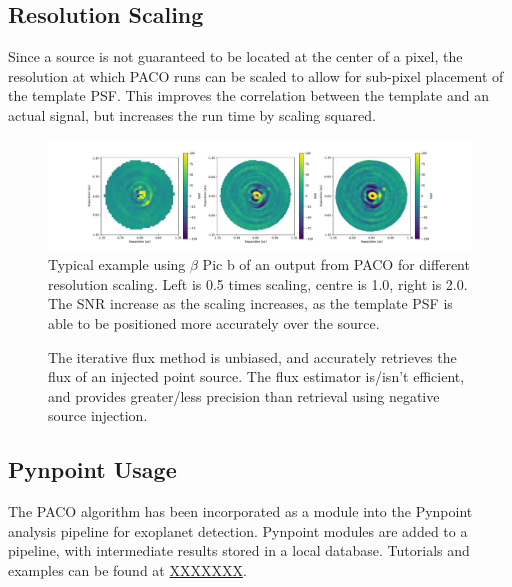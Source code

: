 \documentclass[twocolumn,fleqn]{aastex62}
\begin{document}
\subsection{Resolution Scaling}
Since a source is not guaranteed to be located at the center of a pixel, the resolution at which PACO runs can be scaled to allow for sub-pixel placement of the template PSF. This improves the correlation between the template and an actual signal, but increases the run time by scaling squared.
\begin{figure}[h]
	\hspace{-3em}
	\includegraphics[width=1.25\linewidth]{scaling_3}
	\caption{\label{fig:SNROut} Typical example using $\beta$ Pic b of an output from PACO for different resolution scaling. Left is 0.5 times scaling, centre is 1.0, right is 2.0. The SNR increase as the scaling increases, as the template PSF is able to be positioned more accurately over the source.}
\end{figure}

\begin{figure}[h]
	\caption{\label{fig:FluxRetrieval} The iterative flux method is unbiased, and accurately retrieves the flux of an injected point source. The flux estimator is/isn't efficient, and provides greater/less precision than retrieval using negative source injection.}
\end{figure}
\subsection{Pynpoint Usage}
The PACO algorithm has been incorporated as a module into the Pynpoint analysis pipeline for exoplanet detection.
Pynpoint modules are added to a pipeline, with intermediate results stored in a local database.
Tutorials and examples can be found at \url{XXXXXXX}.
\end{document}
